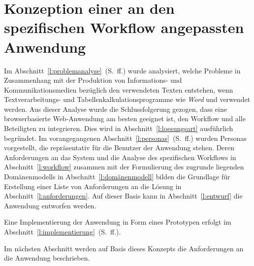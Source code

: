 \section{Konzeption einer an den spezifischen Workflow angepassten Anwendung}\label{l:konzeption}

Im Abschnitt~\ref{l:problemanalyse}~(S.\pageref{l:problemanalyse}~ff.) wurde analysiert, welche Probleme in Zusammenhang mit der Produktion von Informations- und Kommunikationsmedien bezüglich den verwendeten Texten entstehen, wenn Textverarbeitungs- und Tabellenkalkulationsprogramme wie  \emph{Word} und  verwendet werden. Aus dieser Analyse wurde die Schlussfolgerung gezogen, dass eine browserbasierte Web-Anwendung am besten geeignet ist, den Workflow und alle Beteiligten zu integrieren. Dies wird in Abschnitt~\ref{l:loesungsart} ausführlich begründet. Im vorangegangenen Abschnitt~\ref{l:personas}~(S.\pageref{l:personas}~ff.) wurden Personas vorgestellt, die repräsentativ für die Benutzer der Anwendung stehen. Deren Anforderungen an das System und die Analyse des spezifischen Workflows in Abschnitt~\ref{l:workflow} zusammen mit der Formulierung des zugrunde liegenden Domänenmodells in Abschnitt~\ref{l:domänenmodell} bilden die Grundlage für Erstellung einer Liste von Anforderungen an die Lösung in Abschnitt~\ref{l:anforderungen}. Auf dieser Basis kann in Abschnitt~\ref{l:entwurf} die Anwendung entworfen werden.

\bigskip

Eine Implementierung der Anwendung in Form eines Prototypen erfolgt im Abschnitt~\ref{l:implementierung}~(S.\pageref{l:implementierung}~ff.).









\bigskip

Im nächsten Abschnitt werden auf Basis dieses Konzepts die Anforderungen an die Anwendung beschrieben.

\pagebreak